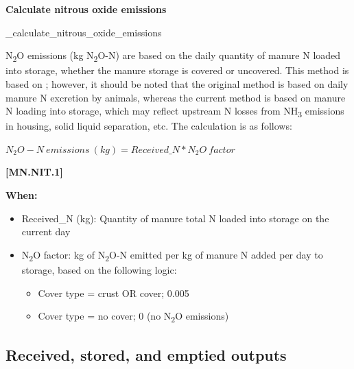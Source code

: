 \begin{refsection}
\begin{itemize}
    \end{itemize} 
    \vspace{0.5cm}




\textbf{Calculate nitrous oxide emissions}
\vspace{0.15cm}

\_calculate\_nitrous\_oxide\_emissions

N\textsubscript{2}O emissions (kg N\textsubscript{2}O-N) are based on the daily quantity of manure N loaded into storage, whether the manure storage is covered or uncovered. This method is based on \cite{IPCC2019}; however, it should be noted that the original \cite{IPCC2006} method is based on daily manure N excretion by animals, whereas the current method is based on manure N loading into storage, which may reflect upstream N losses from NH\textsubscript{3} emissions in housing, solid liquid separation, etc. The calculation is as follows:
        \vspace{0.5cm}

    \begin{center}
\(N_{2}O-N\ emissions\ (kg)= Received\_N * N_2O\ factor\)
    \end{center}
        \vspace{0.5cm} 
    
            {\raggedleft \textbf{[MN.NIT.1]}\par}
            \vspace{0.5cm}

\textbf{When:}
    \begin{itemize}
        \item Received\_N (kg): Quantity of manure total N loaded into storage on the current day
        \item N\textsubscript{2}O factor: kg of N\textsubscript{2}O-N emitted per kg of manure N added per day to storage, based on the following logic:
        \begin{itemize}
            \item Cover type = crust OR cover; 0.005
            \item Cover type = no cover; 0 (no N\textsubscript{2}O emissions)
        \end{itemize}
    \end{itemize}


\subsection{Received, stored, and emptied outputs}
    \vspace{0.15cm}


\end{refsection}
